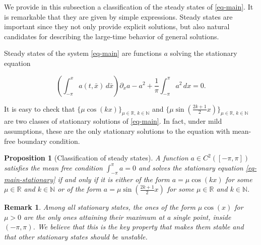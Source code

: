 \documentclass[12pt]{amsart}
\numberwithin{equation}{section}
\def\R{{\mathbb R}}
\numberwithin{equation}{section}
\newtheorem{prop}[thm]{Proposition}
\newtheorem{rmk}[thm]{Remark}
\begin{document}
We provide in this subsection a classification of the steady states of \eqref{eq-main}. It is remarkable that they are given by simple expressions. Steady states are important since they not only provide explicit solutions, but also natural candidates for describing the large-time behavior of general solutions.

Steady states of the system \eqref{eq-main} are functions $a$ solving the stationary equation

\begin{equation} \label{eq-main-stationary}
 \left(\int_{-\pi}^x a(t, \bar x) \,d\bar x\right) \partial_x a -a^2 +\frac{1}{\pi}  \int_{-\pi}^{\pi}a^
2\,dx=0 .
\end{equation}

It is easy to check that $\{\mu\cos(kx)\}_{\mu\in\R, \,k\in\mathbb N}$ and $\{\mu\sin(\frac{2k+1}{2}x)\}_{\mu\in\R, \,k\in\mathbb N}$ are two classes of  stationary solutions of \eqref{eq-main}.   In fact,  under mild assumptions,  these are the only stationary solutions to the equation with mean-free boundary condition.

\begin{prop}[Classification of steady states]\label{Le-SS}
A function $a \in C^2([-\pi, \pi])$ satisfies the mean free condition $\int_{-\pi}^\pi a=0$ and solves the stationary equation \eqref{eq-main-stationary} if and only if it is either of the form $a=\mu\cos(kx)$ for some $\mu\in\R$ and $k\in\mathbb N$ or of the form $a=\mu\sin(\frac{2k+1}{2}x)$ for some $\mu\in\R$ and $k\in\mathbb N.$
\end{prop}

\begin{rmk}
Among all stationary states, the ones of the form $\mu \cos(x)$ for $\mu>0$ are the only ones attaining their maximum at a single point, inside $(-\pi,\pi)$. We believe that this is the key property that makes them stable and that other stationary states should be unstable.
\end{rmk}
\end{document}
